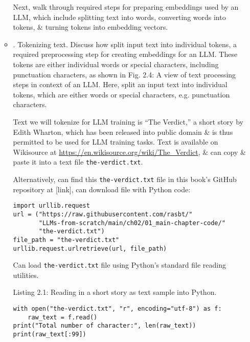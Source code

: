 \documentclass{article}
\begin{document}
\begin{itemize}
\begin{itemize}
		Next, walk through required steps for preparing embeddings used by an LLM, which include splitting text into words, converting words into tokens, \& turning tokens into embedding vectors.
		\item {. Tokenizing text.} Discuss how split input text into individual tokens, a required preprocessing step for creating embeddings for an LLM. These tokens are either individual words or special characters, including punctuation characters, as shown in {\sf Fig. 2.4: A view of text processing steps in context of an LLM. Here, split an input text into individual tokens, which are either words or special characters, e.g. punctuation characters.}
		
		Text we will tokenize for LLM training is ``The Verdict,'' a short story by {\sc Edith Wharton}, which has been released into public domain \& is thus permitted to be used for LLM training tasks. Text is available on Wikisource at \url{https://en.wikisource.org/wiki/The_Verdict}, \& can copy \& paste it into a text file \verb|the-verdict.txt|.
		
		Alternatively, can find this  \verb|the-verdict.txt| file in this book's GitHub repository at [link], can download file with Python code:
		\begin{verbatim}
import urllib.request
url = ("https://raw.githubusercontent.com/rasbt/"
       "LLMs-from-scratch/main/ch02/01_main-chapter-code/"
       "the-verdict.txt")
file_path = "the-verdict.txt"
urllib.request.urlretrieve(url, file_path)
		\end{verbatim}
		Can load {\tt the-verdict.txt} file using Python's standard file reading utilities.
		
		{\sf Listing 2.1: Reading in a short story as text sample into Python.}
		\begin{verbatim}
with open("the-verdict.txt", "r", encoding="utf-8") as f:
    raw_text = f.read()
print("Total number of character:", len(raw_text))
print(raw_text[:99])			
		\end{verbatim}
		

\end{itemize}
\end{itemize}
\end{document}
